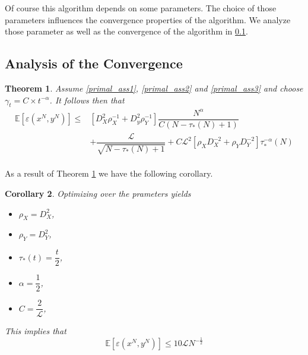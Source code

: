 \documentclass[12pt,reqno]{amsart}
\newtheorem{thm}{Theorem}[section]
\newtheorem{cor}[thm]{Corollary}
\numberwithin{equation}{section}
\begin{document}
Of course this algorithm depends on some parameters. The choice of those parameters influences the convergence properties of the algorithm. We analyze those parameter as well as the convergence of the algorithm in \ref{SASP_convergence}.

\subsection{Analysis of the Convergence} \label{SASP_convergence}

\begin{thm} \label{thm:SASP_convergence}
Assume \ref{primal_ass1}, \ref{primal_ass2} and \ref{primal_ass3} and choose $\gamma_{t} = C \times t^{-\alpha}$. It follows then that
\begin{align*}
\mathbb{E}[\varepsilon(x^{N},y^{N})] \leq& [D_{X}^{2}\rho_{X}^{-1} + D_{y}^{2}\rho_{Y}^{-1}]\dfrac{N^{\alpha}}{C(N - \tau_{*}(N) + 1)}\\
& +\dfrac{\mathcal{L}}{\sqrt{N - \tau_{*}(N) + 1}}+ C\mathcal{L}^{2}[\rho_{X}D_{X}^{-2} + \rho_{Y}D_{Y}^{-2}]\tau_{*}^{-\alpha}(N) \\
\end{align*}
\end{thm}

As a result of Theorem \ref{thm:SASP_convergence} we have the following corollary.

\begin{cor}
Optimizing over the prameters yields
\begin{itemize}
\item $\rho_{X} = D_{X}^{2}$,
\item $\rho_{Y} = D_{Y}^{2}$,
\item $\tau_{*}(t) = \dfrac{t}{2}$,
\item $\alpha = \dfrac{1}{2}$,
\item$C = \dfrac{2}{\mathcal{L}}$,
\end{itemize}
This implies that
$$
\mathbb{E}[\varepsilon(x^{N},y^{N})]  \leq 10\mathcal{L} N^{-\frac{1}{2}}
$$
\end{cor}
\end{document}
